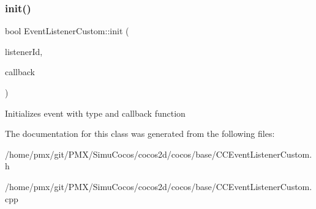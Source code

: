 \subsubsection{\texorpdfstring{init()}{init()}\hspace{0.1cm}{\footnotesize\ttfamily [2/2]}}
{\footnotesize\ttfamily bool Event\+Listener\+Custom\+::init (\begin{DoxyParamCaption}\item[{const Listener\+ID \&}]{listener\+Id,  }\item[{const std\+::function$<$ void(\hyperlink{classEventCustom}{Event\+Custom} $\ast$)$>$ \&}]{callback }\end{DoxyParamCaption})}

Initializes event with type and callback function 

The documentation for this class was generated from the following files\+:\begin{DoxyCompactItemize}
\item 
/home/pmx/git/\+P\+M\+X/\+Simu\+Cocos/cocos2d/cocos/base/C\+C\+Event\+Listener\+Custom.\+h\item 
/home/pmx/git/\+P\+M\+X/\+Simu\+Cocos/cocos2d/cocos/base/C\+C\+Event\+Listener\+Custom.\+cpp\end{DoxyCompactItemize}
